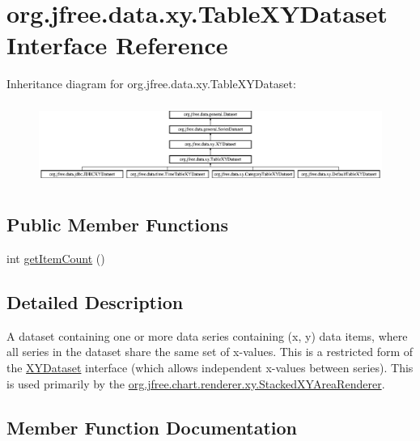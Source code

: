 \hypertarget{interfaceorg_1_1jfree_1_1data_1_1xy_1_1_table_x_y_dataset}{}\section{org.\+jfree.\+data.\+xy.\+Table\+X\+Y\+Dataset Interface Reference}
\label{interfaceorg_1_1jfree_1_1data_1_1xy_1_1_table_x_y_dataset}
Inheritance diagram for org.\+jfree.\+data.\+xy.\+Table\+X\+Y\+Dataset\+:\begin{figure}[H]
\begin{center}
\leavevmode
\includegraphics[height=2.681992cm]{interfaceorg_1_1jfree_1_1data_1_1xy_1_1_table_x_y_dataset}
\end{center}
\end{figure}
\subsection*{Public Member Functions}
\begin{DoxyCompactItemize}
\item 
int \mbox{\hyperlink{interfaceorg_1_1jfree_1_1data_1_1xy_1_1_table_x_y_dataset_ad9cd378be982c1d61cfb93a16370b6f0}{get\+Item\+Count}} ()
\end{DoxyCompactItemize}


\subsection{Detailed Description}
A dataset containing one or more data series containing (x, y) data items, where all series in the dataset share the same set of x-\/values. This is a restricted form of the \mbox{\hyperlink{interfaceorg_1_1jfree_1_1data_1_1xy_1_1_x_y_dataset}{X\+Y\+Dataset}} interface (which allows independent x-\/values between series). This is used primarily by the \mbox{\hyperlink{classorg_1_1jfree_1_1chart_1_1renderer_1_1xy_1_1_stacked_x_y_area_renderer}{org.\+jfree.\+chart.\+renderer.\+xy.\+Stacked\+X\+Y\+Area\+Renderer}}. 

\subsection{Member Function Documentation}
\mbox{\label{interfaceorg_1_1jfree_1_1data_1_1xy_1_1_table_x_y_dataset_ad9cd378be982c1d61cfb93a16370b6f0}} 
